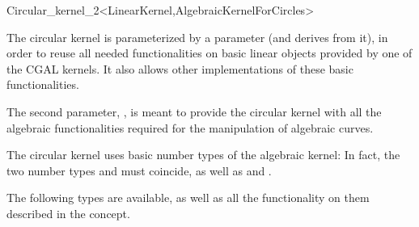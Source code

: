 \begin{ccRefClass}{Circular_kernel_2<LinearKernel,AlgebraicKernelForCircles>}


\ccIsModel


\ccParameters

The circular kernel is parameterized by a  parameter
(and derives from it), in order to reuse all needed functionalities on
basic linear objects provided by one of the CGAL kernels. It also
allows other implementations of these basic functionalities.

The second parameter, , is meant to provide the
circular kernel with all the algebraic functionalities required for the
manipulation of algebraic curves. 

\ccInheritsFrom


\ccTypes

\ccThreeToTwo

The circular kernel uses basic number types of the algebraic kernel:
In fact, the two number types  and
 must coincide, as well as
 and .

The following types are available, as well as all the functionality on
them described in the  concept. 

\ccGlue
{}
\ccGlue
{}

\ccSeeAlso

\\
\\

\end{ccRefClass}
